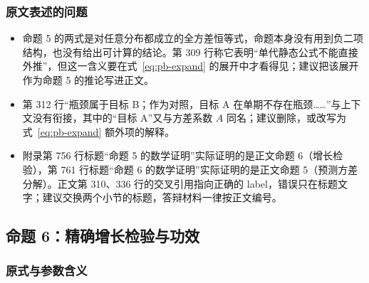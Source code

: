\subsubsection{原文表述的问题}

\begin{itemize}
\item 命题 5 的两式是对任意分布都成立的全方差恒等式，命题本身没有用到负二项结构，也没有给出可计算的结论。第 309 行称它表明“单代静态公式不能直接外推”，但这一含义要在式~\eqref{eq:pb-expand} 的展开中才看得见；建议把该展开作为命题 5 的推论写进正文。
\item 第 312 行“瓶颈属于目标 B；作为对照，目标 A 在单期不存在瓶颈……”与上下文没有衔接，其中的“目标 A”又与方差系数 $A$ 同名；建议删除，或改写为式~\eqref{eq:pb-expand} 额外项的解释。
\item 附录第 756 行标题“命题 5 的数学证明”实际证明的是正文命题 6（增长检验），第 761 行标题“命题 6 的数学证明”实际证明的是正文命题 5（预测方差分解）。正文第 310、336 行的交叉引用指向正确的 label，错误只在标题文字；建议交换两个小节的标题，答辩材料一律按正文编号。
\end{itemize}

\subsection{命题 6：精确增长检验与功效}

\subsubsection{原式与参数含义}


